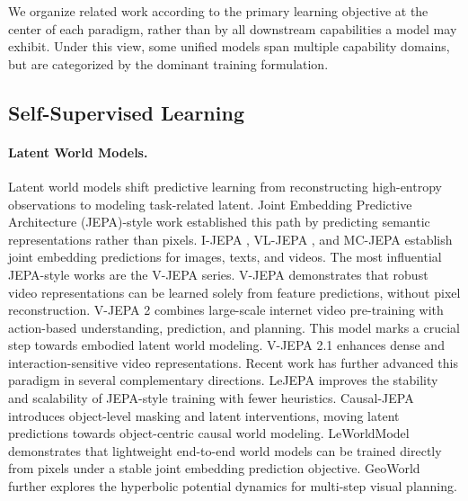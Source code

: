 \documentclass{llmxive}
\providecommand{\thetable}{A\arabic{table}}
\providecommand{\theHtable}{A\arabic{table}}
\begin{document}
\renewcommand{\thetable}{B\arabic{table}}
\renewcommand{\theHtable}{B\arabic{table}}
\setcounter{table}{0}



We organize related work according to the primary learning objective at the center of each paradigm, rather than by all downstream capabilities a model may exhibit. Under this view, some unified models span multiple capability domains, but are categorized by the dominant training formulation.


\vspace{-1em}
\subsection{Self-Supervised Learning}\label{sec:ssl}

\paragraph{Latent World Models.}\label{sec:jepas}
Latent world models shift predictive learning from reconstructing high-entropy observations to modeling task-related latent. Joint Embedding Predictive Architecture (JEPA)-style work established this path by predicting semantic representations rather than pixels. I-JEPA \citep{I-JEPA}, VL-JEPA \citep{VL-JEPA}, and MC-JEPA \citep{MC-JEPA} establish joint embedding predictions for images, texts, and videos. The most influential JEPA-style works are the V-JEPA series. V-JEPA \citep{V-JEPA} demonstrates that robust video representations can be learned solely from feature predictions, without pixel reconstruction. V-JEPA 2 \citep{V-JEPA-2} combines large-scale internet video pre-training with action-based understanding, prediction, and planning. This model marks a crucial step towards embodied latent world modeling. V-JEPA 2.1 \citep{V-JEPA-2.1} enhances dense and interaction-sensitive video representations. Recent work has further advanced this paradigm in several complementary directions. LeJEPA \citep{LeJEPA} improves the stability and scalability of JEPA-style training with fewer heuristics. Causal-JEPA \citep{Causal-JEPA} introduces object-level masking and latent interventions, moving latent predictions towards object-centric causal world modeling. LeWorldModel \citep{LeWorldModel} demonstrates that lightweight end-to-end world models can be trained directly from pixels under a stable joint embedding prediction objective. GeoWorld \citep{GeoWorld} further explores the hyperbolic potential dynamics for multi-step visual planning.
\end{document}
